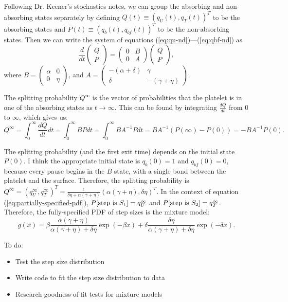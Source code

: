 \documentclass{article}
\newcommand{\tn}{\textnormal}
\newcommand{\dd}{d}
\newcommand{\Der}[2]{\frac{\dd #1}{\dd #2}}
\newcommand{\Integral}[4]{\int_{#3}^{#4} {#1} \dd #2}
\begin{document}
Following Dr. Keener's stochastics notes, we can group the absorbing
and non-absorbing states separately by defining
$Q(t) \equiv (q_U(t), q_T(t))^T$ to be the absorbing states and
$P(t) \equiv (q_b(t), q_{bf}(t))^T$ to be the non-absorbing
states. Then we can write the system of equations
(\ref{eq:qu-nd})---(\ref{eq:qbf-nd}) as
\begin{equation}
  \label{eq:abs-nabs-sys}
  \Der{}{t}
  \begin{pmatrix}
    Q \\ P
  \end{pmatrix}
  =
  \begin{pmatrix}
    0 & B \\
    0 & A
  \end{pmatrix}
  \begin{pmatrix}
    Q \\ P
  \end{pmatrix},
\end{equation}
where $B = \begin{pmatrix} \alpha & 0 \\ 0 & \eta \end{pmatrix}$, and
$A = \begin{pmatrix} -(\alpha + \delta) & \gamma \\ \delta & -(\gamma
  + \eta) \end{pmatrix}$.

The splitting probability $Q^\infty$ is the vector of probabilities
that the platelet is in one of the absorbing states as $t \rightarrow
\infty$. This can be found by integrating $\Der{Q}{t}$ from $0$ to
$\infty$, which gives us:
\begin{equation*}
  Q^\infty = \Integral{\Der{Q}{t}}{t}{0}{\infty} = \Integral{B
    P}{t}{0}{\infty} = \Integral{B A^{-1} P}{t}{0}{\infty} = B A^{-1}
  \left(P(\infty) - P(0) \right) = - B A^{-1} P(0).
\end{equation*}

The splitting probability (and the first exit time) depends on the
initial state $P(0)$. I think the appropriate initial state is
$q_b(0) = 1$ and $q_{bf}(0) = 0$, because every pause begins in the
$B$ state, with a single bond between the platelet and the
surface. Therefore, the splitting probability is
$Q^\infty = (q_U^\infty, q_T^\infty)^T = \frac{1}{\delta \eta +
  \alpha(\gamma + \eta)} \left( \alpha (\gamma + \eta), \delta \eta
\right)^T$. In the context of equation
(\ref{eq:partially-specified-pdf}),
$P[\tn{step is } S_1] = q_U^\infty$ and
$P[\tn{step is } S_2] = q_T^\infty$. Therefore, the fully-specified
PDF of step sizes is the mixture model:
\begin{equation}
  \label{eq:fully-specified-pdf}
  g(x) = \beta \frac{\alpha (\gamma + \eta)}{\alpha (\gamma + \eta) +
    \delta\eta} \exp(-\beta x) + \delta \frac{\delta \eta}{\alpha
    (\gamma + \eta) + \delta \eta} \exp(-\delta x).
\end{equation}



To do:
\begin{itemize}
\item Test the step size distribution
\item Write code to fit the step size distribution to data
\item Research goodness-of-fit tests for mixture models
\end{itemize}

% 
% 
\end{document}
